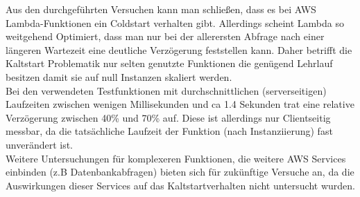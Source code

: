 \documentclass[12pt,a4paper,parskip=half]{scrreprt}
\begin{document}
Aus den durchgeführten Versuchen kann man schließen, dass es bei AWS Lambda-Funktionen ein Coldstart verhalten gibt. Allerdings scheint Lambda so weitgehend Optimiert, dass man nur bei der allerersten Abfrage nach einer längeren Wartezeit eine deutliche Verzögerung feststellen kann. Daher betrifft die Kaltstart Problematik nur selten genutzte Funktionen die genügend Lehrlauf besitzen damit sie auf null Instanzen skaliert werden.
\\
Bei den verwendeten Testfunktionen mit durchschnittlichen (serverseitigen) Laufzeiten zwischen wenigen Millisekunden und ca 1.4 Sekunden trat eine relative Verzögerung zwischen 40\% und 70\% auf. Diese ist allerdings nur Clientseitig messbar, da die tatsächliche Laufzeit der Funktion (nach Instanziierung) fast unverändert ist.
\\
Weitere Untersuchungen für komplexeren Funktionen, die weitere AWS Services einbinden (z.B Datenbankabfragen) bieten sich für zukünftige Versuche an, da die Auswirkungen dieser Services auf das Kaltstartverhalten nicht untersucht wurden.
 


\newpage

\nocite{*}
\thispagestyle{headings}


 
\end{document}
